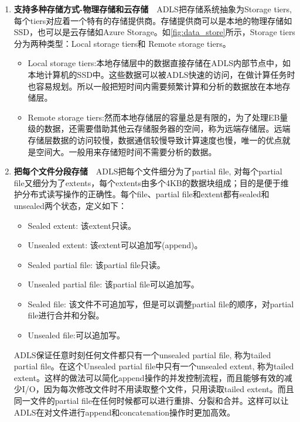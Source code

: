 \documentclass[11pt]{article}
\begin{document}
\begin{enumerate}
	\item \textbf{支持多种存储方式-物理存储和云存储}\ \ ADLS把存储系统抽象为Storage tiers, 每个tiers对应着一个特有的存储提供商。存储提供商可以是本地的物理存储如SSD，也可以是云存储如Azure Storage。如\ref{fig:data_store}所示，Storage tiers分为两种类型：Local storage tiers和 Remote storage tiers。
	\begin{itemize}
		\item Local storage tiers:本地存储层中的数据直接存储在ADLS内部节点中，如本地计算机的SSD中。这些数据可以被ADLS快速的访问，在做计算任务时也容易规划。所以一般把短时间内需要频繁计算和分析的数据放在本地存储层。
		\item Remote storage tiers:然而本地存储层的容量总是有限的，为了处理EB量级的数据，还需要借助其他云存储服务器的空间，称为远端存储层。远端存储层数据的访问较慢，数据通信较慢导致计算速度也慢，唯一的优点就是空间大。一般用来存储短时间不需要分析的数据。
	\end{itemize}
	\item \textbf{把每个文件分段存储}\ \ ADLS把每个文件细分为了partial file, 对每个partial file又细分为了extents，每个extents由多个4KB的数据块组成；目的是便于维护分布式读写操作的正确性。每个file、partial file和extent都有sealed和unsealed两个状态，定义如下：
	\begin{itemize}
		\item Sealed extent: 该extent只读。
		\item Unsealed extent: 该extent可以追加写(append)。
		\item Sealed partial file: 该partial file只读。
		\item Unsealed partial file: 该partial file可以追加写。
		\item Sealed file: 该文件不可追加写，但是可以调整partial file的顺序，对partial file进行合并和分裂。
		\item Unsealed file:可以追加写。
	\end{itemize}
	ADLS保证任意时刻任何文件都只有一个unsealed partial file, 称为tailed partial file。在这个Unsealed partial file中只有一个unsealed extent, 称为tailed extent。这样的做法可以简化append操作的并发控制流程，而且能够有效的减少I/O，因为每次修改文件时不用读取整个文件，只用读取tailed extent。而且同一文件的partial file在任何时候都可以进行重排、分裂和合并。这样可以让ADLS在对文件进行append和concatenation操作时更加高效。
\end{enumerate}
\end{document}
